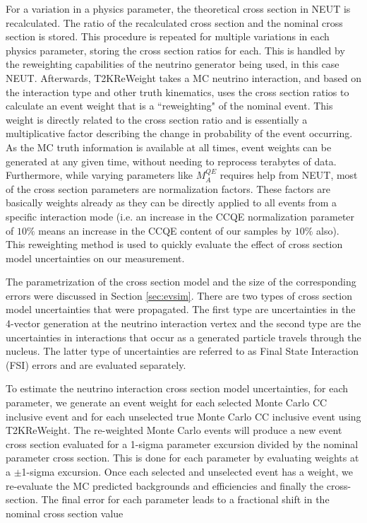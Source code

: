 For a variation in a physics parameter, the theoretical cross section in NEUT is recalculated. The ratio of the recalculated cross section and the nominal cross section is stored. This procedure is repeated for multiple variations in each physics parameter, storing the cross section ratios for each. This is handled by the reweighting capabilities of the neutrino generator being used, in this case NEUT. Afterwards, T2KReWeight takes a MC neutrino interaction, and based on the interaction type and other truth kinematics, uses the cross section ratios to calculate an event weight that is a ``reweighting" of the nominal event. This weight is directly related to the cross section ratio and is essentially a multiplicative factor describing the change in probability of the event occurring. As the MC truth information is available at all times, event weights can be generated at any given time, without needing to reprocess terabytes of data. Furthermore, while varying parameters like $M_A^{QE}$ requires help from NEUT, most of the cross section parameters are normalization factors. These factors are basically weights already as they can be directly applied to all events from a specific interaction mode (i.e. an increase in the CCQE normalization parameter of $10\%$ means an increase in the CCQE content of our samples by $10\%$ also). This reweighting method is used to quickly evaluate the effect of cross section model uncertainties on our measurement.

 The parametrization of the cross section model and the size of the corresponding errors were discussed in Section \ref{sec:evsim}. There are two types of cross section model uncertainties that were propagated. The first type are uncertainties in the 4-vector generation at the neutrino interaction vertex and the second type are the uncertainties in interactions that occur as a generated particle travels through the nucleus. The latter type of uncertainties are referred to as Final State Interaction (FSI) errors and are evaluated separately.

To estimate the neutrino interaction cross section model uncertainties, for each parameter, we generate an event weight for each selected Monte Carlo CC inclusive event and for each unselected true Monte Carlo CC inclusive event using T2KReWeight. The re-weighted Monte Carlo events will produce a new event cross section evaluated for a 1-sigma parameter excursion divided by the nominal parameter cross section. This is done for each parameter by evaluating weights at a $\pm$1-sigma excursion. Once each selected and unselected event has a weight, we re-evaluate the MC predicted backgrounds and efficiencies and finally the cross-section. The final error for each parameter leads to a fractional shift in the nominal cross section value

